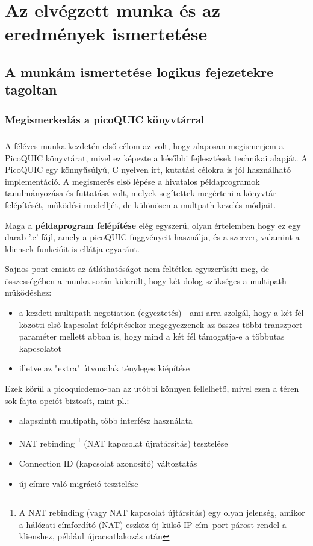 \documentclass[a4paper,oneside]{article}
\begin{document}
\newpage
\section{Az elvégzett munka és az eredmények ismertetése}
\label{sec:az-elvegzett-munka}


\subsection{A munkám ismertetése logikus fejezetekre tagoltan}
\label{sec:a-munkam-ismert}

\subsubsection{Megismerkedás a picoQUIC könyvtárral}

\subparagraph{}
A féléves munka kezdetén első célom az volt, hogy alaposan megismerjem a 
PicoQUIC könyvtárat, mivel ez képezte a későbbi 
fejlesztések technikai alapját. A PicoQUIC egy könnyűsúlyú, C nyelven írt, kutatási 
célokra is jól használható implementáció. A megismerés első lépése a hivatalos példaprogramok 
tanulmányozása és futtatása volt, melyek segítettek megérteni a könyvtár felépítését, 
működési modelljét, de különösen a multpath kezelés módjait.

Maga a \textbf{példaprogram felépítése} elég egyszerű, olyan értelemben hogy ez egy darab '.c' fájl, amely a picoQUIC függvényeit használja, 
és a szerver, valamint a kliensek funkcióit is ellátja egyaránt. 

Sajnos pont emiatt az átláthatóságot nem feltétlen egyszerűsíti meg, de összességében 
a munka során kiderült, hogy két dolog szükséges a multipath működéshez:

\begin{itemize}

  \item a kezdeti multipath negotiation (egyeztetés) - ami arra szolgál, hogy a két fél közötti első
  kapcsolat felépítésekor megegyezzenek az összes többi transzport paraméter mellett abban is, 
  hogy mind a két fél támogatja-e a többutas kapcsolatot

  \item illetve az "extra" útvonalak tényleges kiépítése

\end{itemize}

Ezek körül a picoquicdemo-ban az utóbbi könnyen fellelhető, mivel ezen a téren sok fajta opciót biztosít, mint pl.:
\begin{itemize}
  \item alapszintű multipath, több interfész használata
  \item NAT rebinding \footnote{A NAT rebinding (vagy NAT kapcsolat újtársítás) egy olyan jelenség, 
  amikor a hálózati címfordító (NAT) eszköz új külső IP-cím–port párost rendel a klienshez, 
  például újracsatlakozás után} (NAT kapcsolat újratársítás) tesztelése
  \item Connection ID (kapcsolat azonosító) változtatás 
  \item új címre való migráció tesztelése
\end{itemize}
\end{document}
